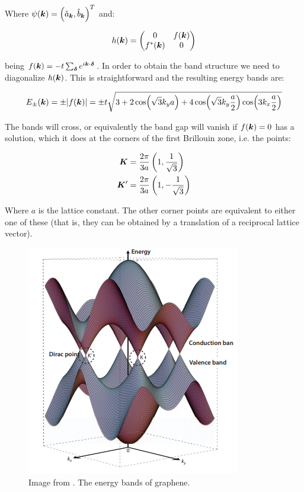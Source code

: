 Where $\psi(\boldsymbol{k}) = \left( \hat{a}_{\boldsymbol{k}}, \hat{b}_{\boldsymbol{k}} \right)^T$ and:

\begin{equation}
h(\boldsymbol{k}) = \begin{pmatrix}
    0 & f(\boldsymbol{k}) \\
    f^*(\boldsymbol{k}) & 0
\end{pmatrix}
\end{equation}

being $f(\boldsymbol{k}) = -t\sum_{\boldsymbol{\delta}} e^{i\boldsymbol{k}\cdot\boldsymbol{\delta}}$. In order to obtain the band structure we need to diagonalize $h(\boldsymbol{k})$. This is straightforward and the resulting energy bands are:

\begin{equation}
E_{\pm}(\boldsymbol{k}) = \pm|f(\boldsymbol{k})| = \pm t\sqrt{3+2\cos(\sqrt{3}k_ya) +4\cos(\sqrt{3}k_y\frac{a}{2})\cos(3k_x\frac{a}{2})}
\end{equation}

The bands will cross, or equivalently the band gap will vanish if $f(\boldsymbol{k})=0$ has a solution, which it does at the corners of the first Brillouin zone, i.e. the points:

\begin{align*}
\boldsymbol{K} &= \frac{2\pi}{3a}\left( 1, \frac{1}{\sqrt{3}}\right) \\
\boldsymbol{K}' &= \frac{2\pi}{3a}\left( 1, -\frac{1}{\sqrt{3}}\right) 
\end{align*}

Where $a$ is the lattice constant. The other corner points are equivalent to either one of these (that is, they can be obtained by a translation of a reciprocal lattice vector).

\begin{figure}
\centering
  \includegraphics[width=0.7\linewidth]{../Figures/graphene_bands.png}
  \caption{Image from \cite{Ando2009}. The energy bands of graphene.} 
\label{FigD1}
\end{figure}

